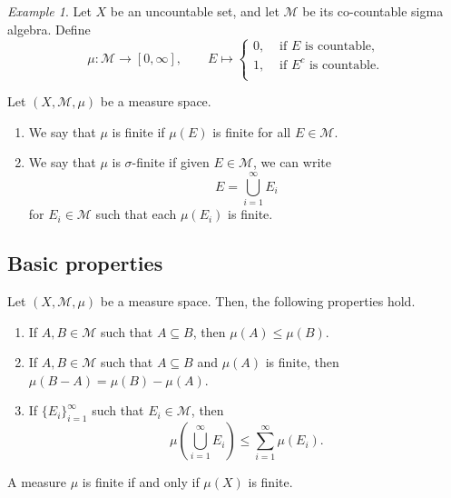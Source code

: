 \documentclass[11pt]{article}
\newcommand{\M}{\mathcal{M}}
\theoremstyle{definition}
\theoremstyle{remark}
\newtheorem*{example}{Example}
\numberwithin{equation}{section}
\begin{document}
    \begin{example}
        Let $X$ be an uncountable set, and let $\M$ be its co-countable sigma
        algebra. Define \[
            \mu\colon \M \to [0, \infty], \qquad E \mapsto \begin{cases}
                0, &\text{ if } E \text{ is countable},\\
                1, &\text{ if } E^c \text{ is countable}.\\
            \end{cases}
        \]
    \end{example}


    \begin{definition}
        Let $(X, \M, \mu)$ be a measure space. \begin{enumerate}
            \itemsep0em
            \item We say that $\mu$ is finite if $\mu(E)$ is finite for all $E \in
            \M$.
            \item We say that $\mu$ is $\sigma$-finite if given $E \in \M$, we
            can write \[
                E = \bigcup_{i = 1}^\infty E_i
            \] for $E_i \in \M$ such that each $\mu(E_i)$ is finite.
        \end{enumerate}
    \end{definition}


    \subsection{Basic properties}

    \begin{lemma}
        Let $(X, \M, \mu)$ be a measure space. Then, the following properties
        hold. \begin{enumerate}
            \itemsep0em
            \item If $A, B \in \M$ such that $A \subseteq B$, then $\mu(A) \leq
            \mu(B)$.
            \item If $A, B \in \M$ such that $A \subseteq B$ and $\mu(A)$ is
            finite, then $\mu(B - A) = \mu(B) - \mu(A)$.
            \item If $\{E_i\}_{i = 1}^\infty$ such that $E_i \in \M$, then \[
                \mu\left(\bigcup_{i = 1}^\infty E_i\right) \leq \sum_{i = 1}^\infty
                \mu(E_i).
            \]
        \end{enumerate}
    \end{lemma}

    \begin{corollary}
        A measure $\mu$ is finite if and only if $\mu(X)$ is finite.
    \end{corollary}
\end{document}
